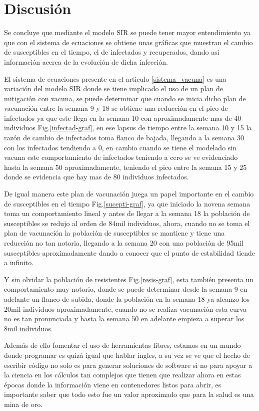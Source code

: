 \section{Discusión}

Se concluye que mediante el modelo SIR se puede  tener mayor entendimiento ya que con el sistema de ecuaciones se obtiene unas gráficas que muestran el cambio de susceptibles en el tiempo, el de infectados y recuperados, dando así información acerca de la evolución de dicha infección.

El sistema de ecuaciones presente en el articulo \ref{sistema_vacuna} es una variación del modelo SIR donde se tiene implicado el uso de un plan de mitigación con vacuna, se puede determinar que cuando se inicia dicho plan de vacunación entre la semana 9 y 18 se obtiene una reducción en el pico de infectados ya que este llega en la semana 10 con aproximadamente mas de 40 individuos Fig.\ref{infectad-graf}, en ese lapsus de tiempo entre la semana 10 y 15 la razón de cambio de infectados toma flanco de bajada, llegando a la semana 30 con los infectados tendiendo a 0, en cambio cuando se tiene el modelado sin vacuna este comportamiento de infectados teniendo a cero se ve evidenciado hasta la semana 50 aproximadamente, teniendo el pico entre la semana 15 y 25 donde se evidencia que hay mas de 80 individuos infectados.

De igual manera este plan de vacunación juega un papel importante en el cambio de susceptibles en el tiempo Fig.\ref{sucepti-graf}, ya que iniciado la novena semana toma un comportamiento lineal y antes de llegar a la semana 18 la población de susceptibles se redujo al orden de 84mil individuos, ahora, cuando no se toma el plan de vacunación la población de susceptibles se mantiene y tiene una reducción no tan notoria, llegando a la semana 20 con una población de 95mil susceptibles aproximadamente dando a conocer que el punto de estabilidad tiende a infinito.

Y sin olvidar la población de resistentes Fig.\ref{resis-graf}, esta también presenta un comportamiento muy notorio, donde se puede determinar desde la semana 9 en adelante un flanco de subida, donde la población en la semana 18 ya alcanzo los 20mil individuos aproximadamente, cuando no se realiza vacunación esta curva no es tan pronunciada y hasta la semana 50 en adelante empieza a superar los 8mil individuos.

Además de ello fomentar el uso de herramientas libres, estamos en un mundo donde programar es quizá igual que hablar ingles, a su vez se ve que el hecho de escribir código no solo es para generar soluciones de software si no para apoyar a la ciencia en los cálculos tan complejos que tienen que realizar ahora en estas épocas donde la información viene en contenedores listos para abrir, es importante saber que todo esto fue un valor aproximado que para la salud es una mina de oro.

